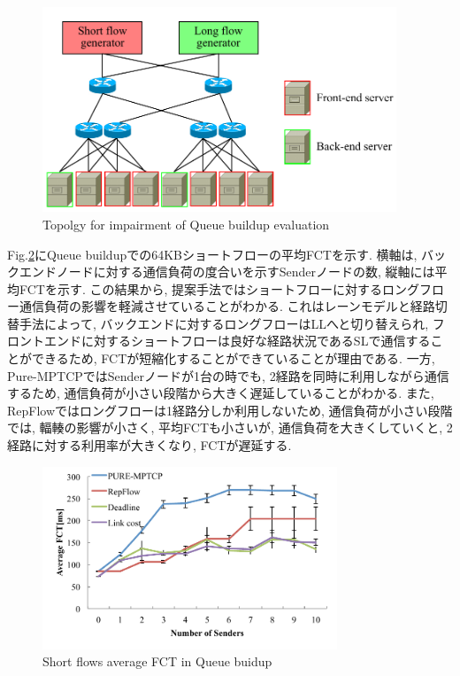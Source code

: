 \begin{figure}[t]
    \begin{center}
    \includegraphics[autoebb, width=300pt]{./img/evalu2.pdf}
    \caption{Topolgy for impairment of Queue buildup evaluation}
    \label{fig:eval2_topo}
    \end{center}
\end{figure}

Fig.\ref{fig:eval2_aver}にQueue buildupでの64KBショートフローの平均FCTを示す. 
横軸は, バックエンドノードに対する通信負荷の度合いを示すSenderノードの数, 縦軸には平均FCTを示す. 
この結果から, 提案手法ではショートフローに対するロングフロー通信負荷の影響を軽減させていることがわかる. 
これはレーンモデルと経路切替手法によって, バックエンドに対するロングフローはLLへと切り替えられ,
フロントエンドに対するショートフローは良好な経路状況であるSLで通信することができるため, FCTが短縮化することができていることが理由である. 
一方,  Pure-MPTCPではSenderノードが1台の時でも, 2経路を同時に利用しながら通信するため,
通信負荷が小さい段階から大きく遅延していることがわかる. 
また, RepFlowではロングフローは1経路分しか利用しないため, 通信負荷が小さい段階では, 輻輳の影響が小さく, 平均FCTも小さいが,
通信負荷を大きくしていくと, 2経路に対する利用率が大きくなり, FCTが遅延する. 

\begin{figure}[t]
    \begin{center}
    \includegraphics[autoebb, width=250pt]{./img/eval2_avr.pdf}
    \caption{Short flows average FCT in Queue buidup}
    \label{fig:eval2_aver}
    \end{center}
\end{figure}

